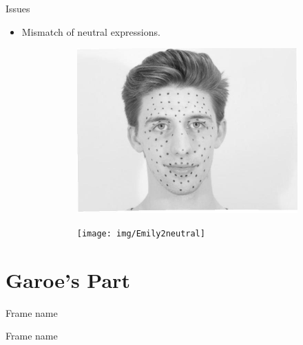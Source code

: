\documentclass{beamer}
\begin{document}
\begin{frame}{Issues}
\begin{itemize}
	\item Mismatch of neutral expressions.
	\begin{figure}
        \centering
        \begin{subfigure}[b]{0.2\textwidth}
                \includegraphics[width=\textwidth]{img/Richard2neutral}
        \end{subfigure}
        \begin{subfigure}[b]{0.2\textwidth}
                \texttt{[image: img/Emily2neutral]}
        \end{subfigure}
\end{figure}
\end{itemize}

\end{frame}

\section{Garoe's Part}
\begin{frame}{Frame name}

\end{frame}


\begin{frame}{Frame name}

\end{frame}


%
\end{document}
